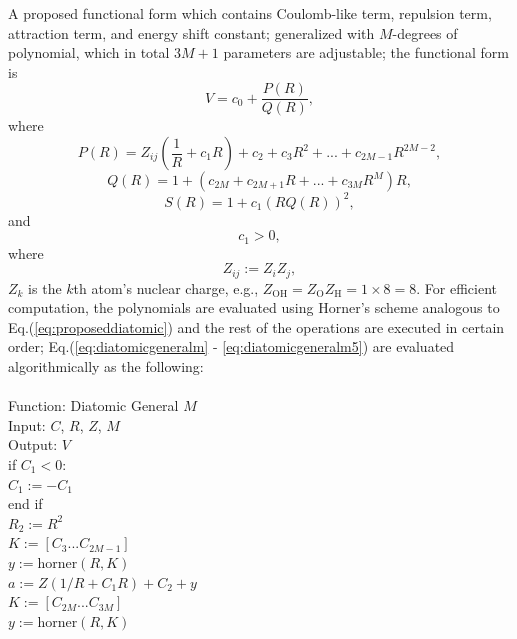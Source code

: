\documentclass[12pt]{article}
\def\spc{\hspace*{0.5cm}} 			%
\begin{document}
A proposed functional form which contains Coulomb-like term, repulsion term, attraction term, and energy shift constant; generalized with $M$-degrees of polynomial, which in total $3M+1$ parameters are adjustable; the functional form is
\begin{equation}
    V = c_0 + \frac{P(R)}{Q(R)},
    \label{eq:diatomicgeneralm}
\end{equation}
where
\begin{equation}
    P(R) = Z_{ij}\left(\frac{1}{R}+ c_1 R\right)+c_2+c_3 R^2+ ...+c_{2M-1}R^{2M-2},
    \label{eq:diatomicgeneralm2}
\end{equation}
\begin{equation}
    Q(R)=1+(c_{2M}+c_{2M+1} R +...+c_{3M} R^M)R,
    \label{eq:diatomicgeneralm3}
\end{equation}
\begin{equation}
    S(R)=1+c_1 (R Q(R))^2,
    \label{eq:diatomicgeneralm4}
\end{equation}
and
\begin{equation}
    c_1 > 0,
    \label{eq:diatomicgeneralm5}
\end{equation}
where  
\begin{equation}
    Z_{ij} := Z_iZ_j,
    \label{eq:diatomicgeneralm6}
\end{equation}
$Z_k$ is the $k$th atom's nuclear charge, e.g., $Z_{\text{OH}} = Z_{\text{O}}Z_{\text{H}} = 1 \times 8 = 8$. For efficient computation, the polynomials are evaluated using Horner's scheme analogous to Eq.(\ref{eq:proposeddiatomic}) and the rest of the operations are executed in certain order; Eq.(\ref{eq:diatomicgeneralm} - \ref{eq:diatomicgeneralm5}) are evaluated algorithmically as the following:
\\
\\
Function: Diatomic General $M$\\
Input: $C$, $R$, $Z$, $M$\\
Output: $V$ \\
if $C_1 < 0$: \\
\spc $C_1 := -C_1$ \\
end if \\
$R_2 := R^2$ \\
$K := [C_3 ... C_{2M-1}]$\\
$y := \text{horner}(R, K)$\\
$a := Z(1/R + C_1R) + C_2 + y$\\
$K := [C_{2M} ... C_{3M}]$\\
$y := \text{horner}(R, K)$\\
\end{document}
